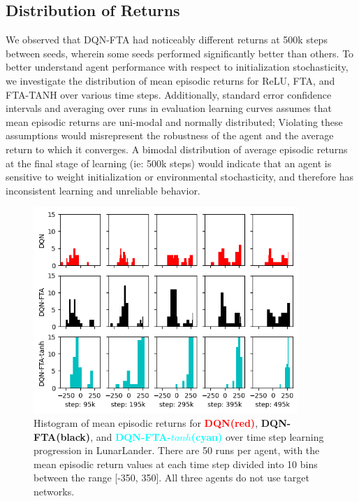 \documentclass{article}
\begin{document}
\subsection{Distribution of Returns} \label{sub-sec:distribution}
We observed that DQN-FTA had noticeably different returns at 500k steps between seeds, wherein some seeds performed significantly better than others. To better understand agent performance with respect to initialization stochasticity, we investigate the distribution of mean episodic returns for ReLU, FTA, and FTA-TANH over various time steps. Additionally, standard error confidence intervals and averaging over runs in evaluation learning curves assumes that mean episodic returns are uni-modal and normally distributed; Violating these assumptions would misrepresent the robustness of the agent and the average return to which it converges. A bimodal distribution of average episodic returns at the final stage of learning (ie: 500k steps) would indicate that an agent is sensitive to weight initialization or environmental stochasticity, and therefore has inconsistent learning and unreliable behavior. 

\begin{figure}[h]
    \centering
    \includegraphics[width=10cm]{distribution.png}
    \caption{Histogram of mean episodic returns for {\textcolor{red} {\bf DQN(red)}}, {\bf DQN-FTA(black)}, and {\textcolor{cyan} {\bf DQN-FTA-$tanh$(cyan)}} over time step learning progression in LunarLander. There are 50 runs per agent, with the mean episodic return values at each time step divided into 10 bins between the range [-350, 350]. All three agents do not use target networks.}
    \label{fig:dist}
\end{figure}
\end{document}
